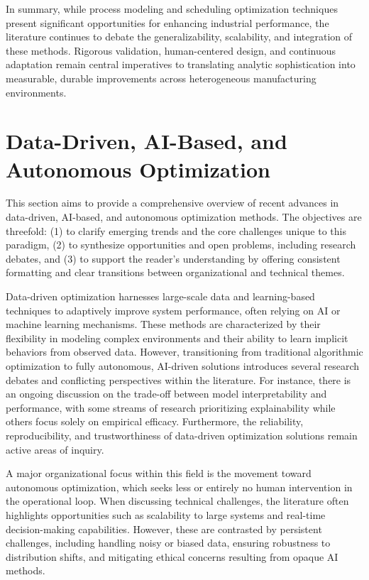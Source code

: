 \documentclass[sigconf]{acmart}
\begin{document}
In summary, while process modeling and scheduling optimization techniques present significant opportunities for enhancing industrial performance, the literature continues to debate the generalizability, scalability, and integration of these methods. Rigorous validation, human-centered design, and continuous adaptation remain central imperatives to translating analytic sophistication into measurable, durable improvements across heterogeneous manufacturing environments.

\section{Data-Driven, AI-Based, and Autonomous Optimization}

This section aims to provide a comprehensive overview of recent advances in data-driven, AI-based, and autonomous optimization methods. The objectives are threefold: (1) to clarify emerging trends and the core challenges unique to this paradigm, (2) to synthesize opportunities and open problems, including research debates, and (3) to support the reader's understanding by offering consistent formatting and clear transitions between organizational and technical themes.

Data-driven optimization harnesses large-scale data and learning-based techniques to adaptively improve system performance, often relying on AI or machine learning mechanisms. These methods are characterized by their flexibility in modeling complex environments and their ability to learn implicit behaviors from observed data. However, transitioning from traditional algorithmic optimization to fully autonomous, AI-driven solutions introduces several research debates and conflicting perspectives within the literature. For instance, there is an ongoing discussion on the trade-off between model interpretability and performance, with some streams of research prioritizing explainability while others focus solely on empirical efficacy. Furthermore, the reliability, reproducibility, and trustworthiness of data-driven optimization solutions remain active areas of inquiry.

A major organizational focus within this field is the movement toward autonomous optimization, which seeks less or entirely no human intervention in the operational loop. When discussing technical challenges, the literature often highlights opportunities such as scalability to large systems and real-time decision-making capabilities. However, these are contrasted by persistent challenges, including handling noisy or biased data, ensuring robustness to distribution shifts, and mitigating ethical concerns resulting from opaque AI methods.
\end{document}
